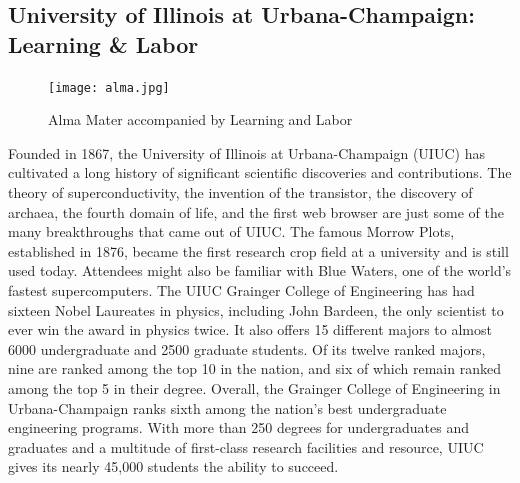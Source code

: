 \subsection{University of Illinois at Urbana-Champaign: Learning \& Labor}
\begin{figure}
  \begin{center}
  \vspace{-\baselineskip}
    \texttt{[image: alma.jpg]}
    \caption{Alma Mater accompanied by Learning and Labor}
  \end{center}
\end{figure}
Founded in 1867, the University of Illinois at Urbana-Champaign (UIUC) has cultivated a long history of significant scientific discoveries and contributions. The theory of superconductivity, the invention of the transistor, the discovery of archaea, the fourth domain of life, and the first web browser are just some of the many breakthroughs that came out of UIUC. The famous Morrow Plots, established in 1876, became the first research crop field at a university and is still used today. Attendees might also be familiar with Blue Waters, one of the world’s fastest supercomputers. 
The UIUC Grainger College of Engineering has had sixteen Nobel Laureates in physics, including John Bardeen, the only scientist to ever win the award in physics twice. It also offers 15 different majors to almost 6000 undergraduate and 2500 graduate students. Of its twelve ranked majors, nine are ranked among the top 10 in the nation, and six of which remain ranked among the top 5 in their degree. Overall, the Grainger College of Engineering in Urbana-Champaign ranks sixth among the nation’s best undergraduate engineering programs. With more than 250 degrees for undergraduates and graduates and a multitude of first-class research facilities and resource, UIUC gives its nearly 45,000 students the ability to succeed. 

